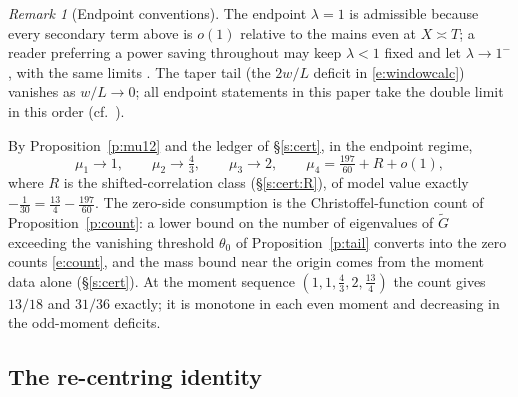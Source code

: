 \documentclass[11pt]{article}
\numberwithin{equation}{section}
\theoremstyle{definition}
\theoremstyle{remark}
\newtheorem{remark}[theorem]{Remark}
\begin{document}
\begin{remark}[Endpoint conventions]\label{r:endpoint}
The endpoint $\lambda=1$ is admissible because every secondary
term above is $o(1)$ relative to the mains even at $X\asymp T$;
a reader preferring a power saving throughout may keep
$\lambda<1$ fixed and let $\lambda\to1^-$, with the same
limits \cite[Rem.~6.1]{C26}. The taper tail (the $2w/L$ deficit
in \eqref{e:windowcalc}) vanishes as $w/L\to0$; all endpoint
statements in this paper take the double limit in this order
(cf.\ \cite[\S7.1]{C26}).
\end{remark}

By Proposition~\ref{p:mu12} and the ledger of \S\ref{s:cert},
in the endpoint regime,
\begin{equation}\label{e:moments}
\mu_1\to1,\qquad \mu_2\to\tfrac43,\qquad \mu_3\to2,\qquad
\mu_4=\tfrac{197}{60}+R+o(1),
\end{equation}
where $R$ is the shifted-correlation class (\S\ref{s:cert:R}),
of model value exactly $-\tfrac1{30}=\tfrac{13}4-\tfrac{197}{60}$.
The zero-side consumption is the Christoffel-function count of
Proposition~\ref{p:count}: a lower bound on the number of
eigenvalues of $\widetilde G$ exceeding the vanishing threshold
$\theta_0$ of Proposition~\ref{p:tail} converts into the zero
counts \eqref{e:count}, and the mass bound near the origin comes
from the moment data alone (\S\ref{s:cert}). At the moment sequence
$(1,1,\tfrac43,2,\tfrac{13}4)$ the count gives $13/18$ and
$31/36$ exactly; it is monotone in each even moment and
decreasing in the odd-moment deficits.

\subsection{The re-centring identity}\label{s:recentre}
\end{document}
